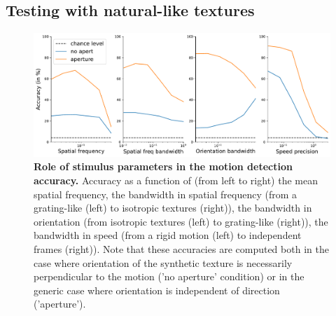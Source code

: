\documentclass[default]{sn-jnl}%
\theoremstyle{thmstyleone}%
\theoremstyle{thmstyletwo}%
\theoremstyle{thmstylethree}%
\newcommand{\note}[1]{{\sethlcolor{yellow}\hl{#1}}}
\begin{document}
%

%
\subsection{Testing with natural-like textures}
\begin{figure}%
    \centering
    \includegraphics[width=0.99\linewidth]{figures/motion_clouds.pdf} %
    \caption{{\bf Role of stimulus parameters in the motion detection accuracy.} Accuracy as a function of (from left to right) the mean spatial frequency, the bandwidth in spatial frequency (from a grating-like (left) to isotropic textures (right)), the bandwidth in orientation (from isotropic textures (left) to grating-like (right)), the bandwidth in speed (from a rigid motion (left) to independent frames (right)). Note that these accuracies are computed both in the case where orientation of the synthetic texture is necessarily perpendicular to the motion ('no aperture' condition) or in the generic case where orientation is independent of direction ('aperture').}
    \label{fig:motion_clouds}
\end{figure}
\end{document}

